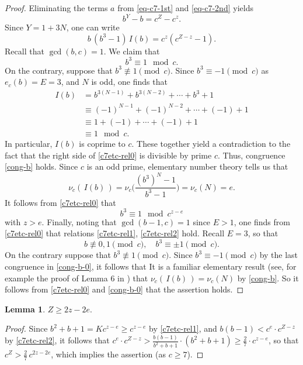 \documentclass[11pt]{amsart}
\newtheorem{lem}{Lemma}[section]
\numberwithin{equation}{section}
\begin{document}
\begin{proof}
Eliminating the terms $a$ from  \eqref{eq-c7-1st} and \eqref{eq-c7-2nd} yields 
\[
b^Y-b=c^Z-c^z.
\]
Since $Y=1+3N$, one can write
\begin{equation}\label{c7etc-rel0}
b\,(b^3-1)\,I(b)=c^z(c^{Z-z}-1).
\end{equation}
Recall that $\gcd(b,c)=1$.
We claim that
\begin{equation}\label{cong-b}
b^3 \equiv 1 \mod{c}.
\end{equation}
On the contrary, suppose that $b^3 \not\equiv 1 \pmod{c}$.
Since $b^3 \equiv -1 \pmod{c}$ as $e_{c}(b)=E=3$, and $N$ is odd, one finds that
\begin{align*}
I(b)&=b^{3(N-1)}+b^{3(N-2)}+ \cdots +b^3+1 \\
&\equiv (-1)^{N-1}+(-1)^{N-2}+ \cdots +(-1)+1\\
& \equiv 1+(-1)+\cdots +(-1)+1 \\
&\equiv 1 \mod{c}.
\end{align*}
In particular, $I(b)$ is coprime to $c$.
These together yield a contradiction to the fact that the right side of \eqref{c7etc-rel0} is divisible by prime $c$.
Thus, congruence \eqref{cong-b} holds.
Since $c$ is an odd prime, elementary number theory tells us that 
\[
\nu_{c}(\,I( b )\,)=\nu_{c}\bigg(\frac{(b^3)^N-1}{b^3-1}\bigg)=\nu_{c}(N)=e.
\]
It follows from \eqref{c7etc-rel0} that 
\[
b^3 \equiv 1 \mod{c^{z-e}}
\]
with $z>e$.
Finally, noting that $\gcd(b-1,c)=1$ since $E>1$, one finds from \eqref{c7etc-rel0} that relations \eqref{c7etc-rel1}, \eqref{c7etc-rel2} hold.
Recall $E=3$, so that 
\begin{equation}\label{cong-b-0}
b \not\equiv 0,1 \pmod{c}, \quad b^3 \equiv \pm 1 \pmod{c}.
\end{equation}
On the contrary suppose that $b^3 \not\equiv 1 \pmod{c}$.
Since $b^3 \equiv -1 \pmod{c}$ by the last congruence in \eqref{cong-b-0}, it follows that
It is a familiar elementary result (see, for example the proof of Lemma 6 in \cite{ScSt2}) that $\nu_c(\,I(b)\,)=\nu_{c}(N)$ by \eqref{cong-b}.  So it follows from \eqref{c7etc-rel0} and \eqref{cong-b-0} that the assertion holds.
\fi
\end{proof}

\begin{lem}\label{c7etc-lem-Zge2z2e}
$Z \ge 2z-2e.$
\end{lem}

\begin{proof}
Since $b^2+b+1=Kc^{z-e} \ge c^{z-e}$ by \eqref{c7etc-rel1}, and $b(b-1)<c^e \cdot c^{Z-z}$  by \eqref{c7etc-rel2}, it follows that $c^e \cdot c^{Z-z}>\frac{b(b-1)}{b^2+b+1} \cdot (b^2+b+1) \ge \frac{2}{7}\cdot c^{z-e}$, so that $c^Z>\frac{2}{7}\,c^{2z-2e}$, which implies the assertion (as $c \ge 7$).
\end{proof}
\end{document}
